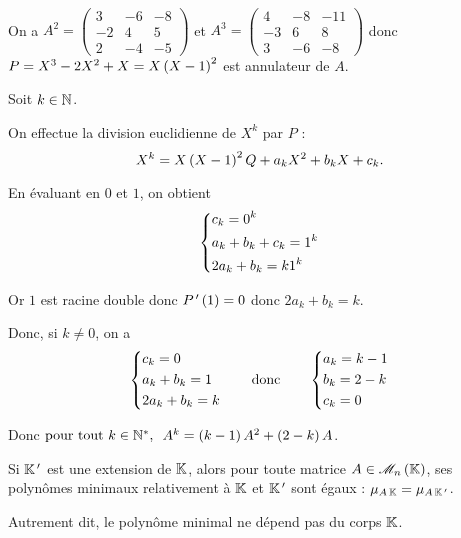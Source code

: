 \begin{corr}~\\
On a \(A^2=\begin{pmatrix}
3 & -6 & -8 \\
-2 & 4 & 5 \\
2 & -4 & -5
\end{pmatrix}\) et \(A^3=\begin{pmatrix}
4 & -8 & -11 \\
-3 & 6 & 8 \\
3 & -6 & -8
\end{pmatrix}\) donc \(P=X^3-2X^2+X=X\left(X-1\right)^2\) est annulateur de \(A\).

Soit \(k\in\mathbb{N}\).

On effectue la division euclidienne de \(X^k\) par \(P\) : \[X^k=X\left(X-1\right)^2Q+a_kX^2+b_kX+c_k.\]

En évaluant en \(0\) et \(1\), on obtient \[\begin{dcases}
c_k=0^k \\
a_k+b_k+c_k=1^k \\
2a_k+b_k=k1^k
\end{dcases}\]

Or \(1\) est racine double donc \(P^{\,\prime}\left(1\right)=0\) donc \(2a_k+b_k=k\).

Donc, si \(k\not=0\), on a \[\begin{dcases}
c_k=0 \\
a_k+b_k=1 \\
2a_k+b_k=k
\end{dcases}\qquad\text{donc}\qquad\begin{dcases}
a_k=k-1 \\
b_k=2-k \\
c_k=0
\end{dcases}\]

Donc \(\quantifs{\tpt k\in\Ns}A^k=\paren{k-1}A^2+\paren{2-k}A\).
\end{corr}

\begin{cor}
Si \(\mathbb{K}^{\,\prime}\) est une extension de \(\mathbb{K}\), alors pour toute matrice \(A\in\M{n}\), ses polynômes minimaux relativement à \(\mathbb{K}\) et \(\mathbb{K}^{\,\prime}\) sont égaux : \(\mu_{A\,\mathbb{K}}=\mu_{A\,\mathbb{K}^{\,\prime}}\).

Autrement dit, le polynôme minimal ne dépend pas du corps \(\mathbb{K}\).
\end{cor}

